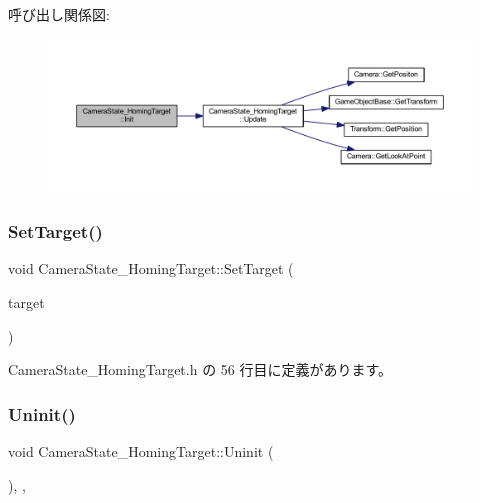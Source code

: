 呼び出し関係図\+:\nopagebreak
\begin{figure}[H]
\begin{center}
\leavevmode
\includegraphics[width=350pt]{class_camera_state___homing_target_a9222190a5f26d564e99623b05941d382_cgraph}
\end{center}
\end{figure}
\mbox{\label{class_camera_state___homing_target_a5beacf25aaff9547b5c4e32cec698e28}} 
\subsubsection{\texorpdfstring{Set\+Target()}{SetTarget()}}
{\footnotesize\ttfamily void Camera\+State\+\_\+\+Homing\+Target\+::\+Set\+Target (\begin{DoxyParamCaption}\item[{\mbox{\hyperlink{class_game_object_base}{Game\+Object\+Base}} $\ast$}]{target }\end{DoxyParamCaption})\hspace{0.3cm}{\ttfamily [inline]}}



 Camera\+State\+\_\+\+Homing\+Target.\+h の 56 行目に定義があります。

\mbox{\label{class_camera_state___homing_target_ab2b5379b35ebafc53189bf4d45646c8c}} 
\subsubsection{\texorpdfstring{Uninit()}{Uninit()}}
{\footnotesize\ttfamily void Camera\+State\+\_\+\+Homing\+Target\+::\+Uninit (\begin{DoxyParamCaption}{ }\end{DoxyParamCaption})\hspace{0.3cm}{\ttfamily [inline]}, {\ttfamily [override]}, {\ttfamily [virtual]}}



